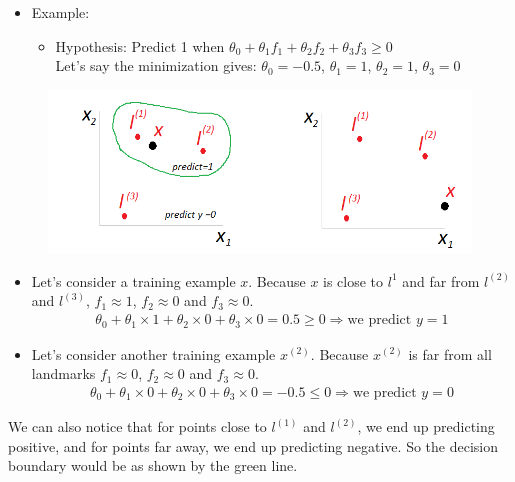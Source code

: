 \documentclass[a4paper,12pt]{report}
\begin{document}
\begin{itemize}
\item Example:
\begin{itemize}
\item Hypothesis: Predict 1 when $\theta_0 + \theta_1 f_1 + \theta_2 f_2 + \theta_3 f_3 \geq 0$ \\
Let's say the minimization gives: $\theta_0 = -0.5$, $\theta_1 = 1$, $\theta_2 = 1$, $\theta_3 = 0$
\end{itemize}
\end{itemize}
\begin{figure}[H]
	\centering
        \includegraphics[totalheight=4 cm]{landmarksExple.png}\caption{}
\end{figure}
\begin{itemize}
\item Let's consider a training example $x$. Because $x$ is close to $l^{1}$ and far from $l^{(2)}$ and $l^{(3)}$, $f_1 \approx 1$, $f_2 \approx 0$ and $f_3 \approx 0$. 
\begin{align}
\theta_0 + \theta_1 \times 1 + \theta_2 \times 0 + \theta_3 \times 0 = 0.5 \geq 0 \Rightarrow \text{we predict\ } y=1
\end{align}
\end{itemize}
\begin{itemize}
\item Let's consider another training example $x^{(2)}$. Because $x^{(2)}$ is far from all landmarks $f_1 \approx 0$, $f_2 \approx 0$ and $f_3 \approx 0$. 
\begin{align}
\theta_0 + \theta_1 \times 0 + \theta_2 \times 0 + \theta_3 \times 0 = -0.5 \leq 0 \Rightarrow \text{we predict\ }  y=0
\end{align}
\end{itemize}
We can also notice that for points close to $l^{(1)}$ and $l^{(2)}$, we end up predicting positive, and for points far away, we end up predicting negative. So the decision boundary would be as shown by the green line.
\end{document}
